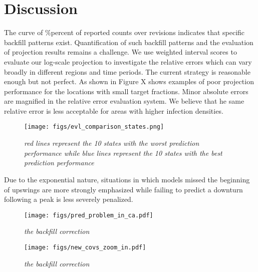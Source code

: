 

\section{Discussion}
The curve of \%percent of reported counts over revisions indicates that specific backfill patterns exist. Quantification of such backfill patterns and the evaluation of projection results remains a challenge. We use weighted interval scores to evaluate our log-scale projection to investigate the relative errors which can vary broadly in different regions and time periods.  The current strategy is reasonable enough but not perfect. As shown in Figure X shows examples of poor projection performance for the locations with small target fractions. Minor absolute errors are magnified in the relative error evaluation system. We believe that he same relative error is less acceptable for areas with higher infection densities. 

\begin{figure}
    \centering
    \texttt{[image: figs/evl\_comparison\_states.png]}
    \caption{\textit{red lines represent the 10 states with the worst prediction performance while blue lines represent the 10 states with the best prediction performance}}
\end{figure}

Due to the exponential nature, situations in which models missed the beginning of upswings are more strongly emphasized while failing to predict a downturn following a peak is less severely penalized. 
\begin{figure}
    \centering
    \texttt{[image: figs/pred\_problem\_in\_ca.pdf]}
    \caption{\textit{the backfill correction}}
\end{figure}

\begin{figure}
    \centering
    \texttt{[image: figs/new\_covs\_zoom\_in.pdf]}
    \caption{\textit{the backfill correction}}
\end{figure}